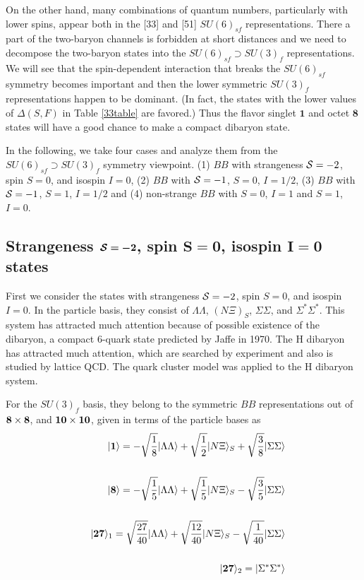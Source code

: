 \documentclass[aps,prd,showpacs,floatfix,reprint,nofootinbib]{revtex4-1}
\newcommand \cc[1]{{\bm {#1}}}
\begin{document}
On the other hand, many combinations of quantum numbers, particularly with lower spins, appear both 
in the [33] and [51] $SU(6)_{sf}$ representations.
There a part of the two-baryon channels is forbidden at short distances and 
we need to decompose the two-baryon states into the $SU(6)_{sf} \supset SU(3)_f$ representations. 
We will see that the spin-dependent interaction that breaks the $SU(6)_{sf}$ symmetry becomes important
and then the lower symmetric $SU(3)_f$ representations happen to be dominant.
(In fact, the states with the lower values of $\Delta(S,F)$ in Table \ref{33table} are favored.)
Thus the flavor singlet $\cc{1}$ and octet $\cc{8}$ states will have a good chance to make a compact dibaryon state.

In the following, we take four cases and analyze them from the $SU(6)_{sf} \supset SU(3)_f$ symmetry viewpoint. (1) $BB$ with strangeness ${\cal S}= -2$, spin $S=0$, and isospin $I=0$, (2) $BB$ with ${\cal S}=-1$, $S=0$, $I=1/2$, (3) $BB$ with ${\cal S}=-1$, $S=1$, $I=1/2$ and (4) non-strange $BB$ with $S=0$, $I=1$ and $S=1$, $I=0$. 



\subsection{Strangeness $\bm{{\cal S}=-2}$, spin $\bm{S=0}$, isospin $\bm{I=0}$ states}\label{S=-2}

First we consider the states with strangeness ${\cal S}=-2$, spin $S=0$, and isospin $I=0$.
In the particle basis, they consist of
$\Lambda\Lambda$, $(N \Xi)_S$, $\Sigma\Sigma$, and $\Sigma^*\Sigma^*$.
This system has attracted much attention because of  possible existence of the dibaryon, a compact 6-quark
state predicted by Jaffe in 1970\cite{Jaffe}.
The H dibaryon has attracted much attention, which are searched by experiment\cite{H-search} and also is studied by lattice QCD\cite{H-dibaryon-HALQCD}. 
The quark cluster model was applied to the H dibaryon system\cite{OSYforH}.

For the $SU(3)_f$ basis, they belong to the symmetric $BB$ representations out of
 ${\bf 8}\times{\bf 8}$, and ${\bf 10}\times{\bf 10}$, given in terms of the particle bases as
\begin{eqnarray}
&& |{\bf 1}\rangle = -\sqrt{\frac{1}{8}} |\Lambda\Lambda\rangle + \sqrt{\frac{1}{2}} |N\Xi \rangle_S 
+ \sqrt{\frac{3}{8}} |\Sigma\Sigma\rangle
\\
\nonumber\\
&&  |{\bf 8}\rangle = -\sqrt{\frac{1}{5}} |\Lambda\Lambda\rangle + \sqrt{\frac{1}{5}} |N\Xi \rangle_S 
- \sqrt{\frac{3}{5}} |\Sigma\Sigma\rangle
\\
\nonumber\\
&&  |{\bf 27}\rangle_1 = \sqrt{\frac{27}{40}} |\Lambda\Lambda\rangle + \sqrt{\frac{12}{40}} |N\Xi \rangle_S 
- \sqrt{\frac{1}{40}} |\Sigma\Sigma\rangle
\\
\nonumber\\
&& |{\bf 27}\rangle_2 =  |\Sigma^*\Sigma^*\rangle
\end{eqnarray}
\end{document}
